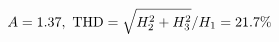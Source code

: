 \documentclass[preview]{standalone}
\begin{document}
\begin{align*}
\special{dvisvgm:raw <g id='unique000'>}A=1.37,\ \text{THD}=\sqrt{H_2^2+H_3^2}/H_1=21.7\%\special{dvisvgm:raw </g>}
\end{align*}
\end{document}
